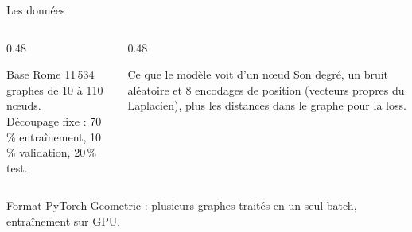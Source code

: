 \documentclass[aspectratio=169,11pt]{beamer}
\begin{document}
\begin{frame}{Les données}
\begin{columns}[T]
\begin{column}{0.48\textwidth}
\begin{block}{Base Rome}
\small 11\,534 graphes de 10 à 110 nœuds.\\
Découpage fixe : 70\,\% entraînement, 10\,\% validation, 20\,\% test.
\end{block}
\end{column}
\begin{column}{0.48\textwidth}
\begin{block}{Ce que le modèle voit d'un nœud}
\small Son degré, un bruit aléatoire et 8 encodages de position (vecteurs propres du Laplacien), plus les distances dans le graphe pour la loss.
\end{block}
\end{column}
\end{columns}

\vspace{0.4cm}
\small Format PyTorch Geometric : plusieurs graphes traités en un seul batch, entraînement sur GPU.

\vspace{0.4cm}
\end{frame}
\end{document}

